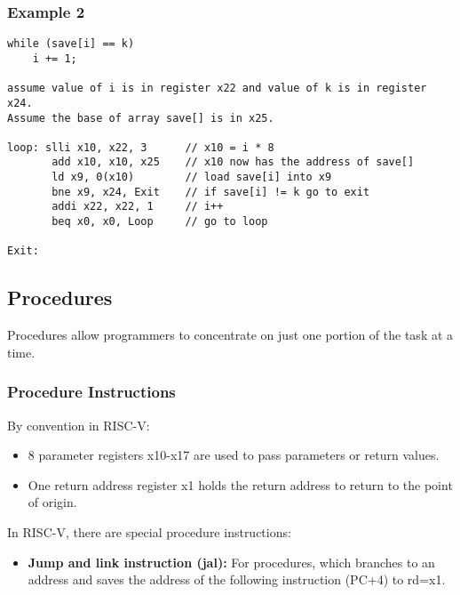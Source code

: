 \documentclass{article}
\begin{document}
\subsubsection*{Example 2}
\begin{verbatim}
while (save[i] == k)
    i += 1;

assume value of i is in register x22 and value of k is in register x24.
Assume the base of array save[] is in x25.

loop: slli x10, x22, 3      // x10 = i * 8
       add x10, x10, x25    // x10 now has the address of save[]
       ld x9, 0(x10)        // load save[i] into x9
       bne x9, x24, Exit    // if save[i] != k go to exit
       addi x22, x22, 1     // i++
       beq x0, x0, Loop     // go to loop

Exit:
\end{verbatim}

\subsection*{Procedures}
Procedures allow programmers to concentrate on just one portion of the task at a time.

\subsubsection{Procedure Instructions}
By convention in RISC-V:
\begin{itemize}
    \item 8 parameter registers x10-x17 are used to pass parameters or return values.
    \item One return address register x1 holds the return address to return to the point of origin.
\end{itemize}

In RISC-V, there are special procedure instructions:
\begin{itemize}
    \item \textbf{Jump and link instruction (jal):} For procedures, which branches to an address and saves the address of the following instruction (PC+4) to rd=x1.
\end{itemize}
\end{document}
